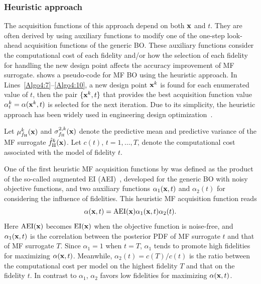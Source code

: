 \documentclass[iicol,sn-basic]{sn-jnl}%
\begin{document}
\subsubsection{Heuristic approach}\label{Sec522}

The acquisition functions of this approach depend on both $\bf x$ and $t$.
They are often derived by using auxiliary functions to modify one of the one-step look-ahead acquisition functions of the generic BO.
These auxiliary functions consider the computational cost of each fidelity and/or how the selection of each fidelity for handling the new design point affects the accuracy improvement of MF surrogate.
 shows a pseudo-code for MF BO using the heuristic approach.
In Lines~\ref{Algo4:7}--\ref{Algo4:10}, a new design point ${\bf x}^k$ is found for each enumerated value of $t$, then the pair $\{{\bf x}^k,t\}$ that provides the best acquisition function value ${\alpha}^k_t=\alpha({\bf x}^k,t)$ is selected for the next iteration.
Due to its simplicity, the heuristic approach has been widely used in engineering design optimization~\citep[see e.g.,][]{Huang2006smo,Poloczek2017,Ghoreishi2019,Fiore2021,Grassi2023}.

Let $\mu^k_{f_\text{H}}(\bf x)$ and $\sigma_{f_\text{H}}^{2,k}(\bf x)$ denote the predictive mean and predictive variance of the MF surrogate $\hat{f}_\text{H}^k(\bf x)$.
Let $c(t)$, $t=1,\dots,T$, denote the computational cost associated with the model of fidelity $t$.

One of the first heuristic MF acquisition functions by \cite{Huang2006smo} was defined as the product of the so-called augmented EI (AEI)~\citep{Huang2006jgo}, developed for the generic BO with noisy objective functions, and two auxiliary functions $\alpha_1({\bf x},t)$ and $\alpha_2(t)$ for considering the influence of fidelities.
This heuristic MF acquisition function reads
\begin{equation}\label{eqn56}
	\alpha({\bf x},t) = \text{AEI}({\bf x}) \alpha_1({\bf x},t) \alpha_2(t).
\end{equation}
Here $\text{AEI}({\bf x})$ becomes $\text{EI}({\bf x})$ when the objective function is noise-free, and $\alpha_1({\bf x},t)$ is the correlation between the posterior PDF of MF surrogate $t$ and that of MF surrogate $T$.
Since $\alpha_1 = 1$ when $t=T$, $\alpha_1$ tends to promote high fidelities for maximizing $\alpha({\bf x},t)$. 
Meanwhile, $\alpha_2(t) = c(T)/c(t)$ is the ratio between the computational cost per model on the highest fidelity $T$ and that on the fidelity $t$.
In contrast to $\alpha_1$, $\alpha_2$ favors low fidelities for maximizing $\alpha({\bf x},t)$.
\end{document}
